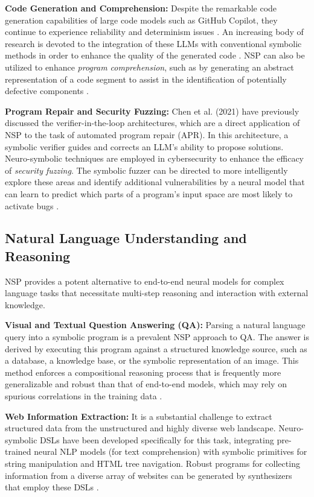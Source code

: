 \documentclass[12pt, a4paper]{report}
\begin{document}
\textbf{Code Generation and Comprehension:} Despite the remarkable code generation capabilities of large code models such as GitHub Copilot, they continue to experience reliability and determinism issues \citep{shiqi2019neuro}. An increasing body of research is devoted to the integration of these LLMs with conventional symbolic methods in order to enhance the quality of the generated code \citep{zhang2024proofofthought}. NSP can also be utilized to enhance \textit{program comprehension}, such as by generating an abstract representation of a code segment to assist in the identification of potentially defective components \citep{ding2022patch}.

\textbf{Program Repair and Security Fuzzing:} Chen et al. (2021) \citep{chen2021evaluating} have previously discussed the verifier-in-the-loop architectures, which are a direct application of NSP to the task of automated program repair (APR). In this architecture, a symbolic verifier guides and corrects an LLM's ability to propose solutions. Neuro-symbolic techniques are employed in cybersecurity to enhance the efficacy of \textit{security fuzzing}. The symbolic fuzzer can be directed to more intelligently explore these areas and identify additional vulnerabilities by a neural model that can learn to predict which parts of a program's input space are most likely to activate bugs \citep{zong2020fuzzing}.

\subsection{Natural Language Understanding and Reasoning}
NSP provides a potent alternative to end-to-end neural models for complex language tasks that necessitate multi-step reasoning and interaction with external knowledge.

\textbf{Visual and Textual Question Answering (QA):} Parsing a natural language query into a symbolic program is a prevalent NSP approach to QA. The answer is derived by executing this program against a structured knowledge source, such as a database, a knowledge base, or the symbolic representation of an image. This method enforces a compositional reasoning process that is frequently more generalizable and robust than that of end-to-end models, which may rely on spurious correlations in the training data \citep{zhan2021framework}.

\textbf{Web Information Extraction:} It is a substantial challenge to extract structured data from the unstructured and highly diverse web landscape. Neuro-symbolic DSLs have been developed specifically for this task, integrating pre-trained neural NLP models (for text comprehension) with symbolic primitives for string manipulation and HTML tree navigation. Robust programs for collecting information from a diverse array of websites can be generated by synthesizers that employ these DSLs \citep{knoth2023type}.
\end{document}
